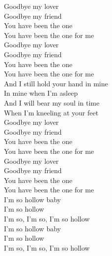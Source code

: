 \documentclass{novel}
\begin{document}
\begin{multicols}{2}
Goodbye my lover \\
Goodbye my friend \\
You have been the one \\
You have been the one for me \\
Goodbye my lover \\
Goodbye my friend \\
You have been the one \\
You have been the one for me \\

And I still hold your hand in mine \\
In mine when I'm asleep \\
And I will bear my soul in time \\
When I'm kneeling at your feet \\

Goodbye my lover \\
Goodbye my friend \\
You have been the one \\
You have been the one for me \\
Goodbye my lover \\
Goodbye my friend \\
You have been the one \\
You have been the one for me \\

I'm so hollow baby \\
I'm so hollow \\
I'm so, I'm so, I'm so hollow \\
I'm so hollow baby \\
I'm so hollow \\
I'm so, I'm so, I'm so hollow
\end{multicols}
\end{document}

